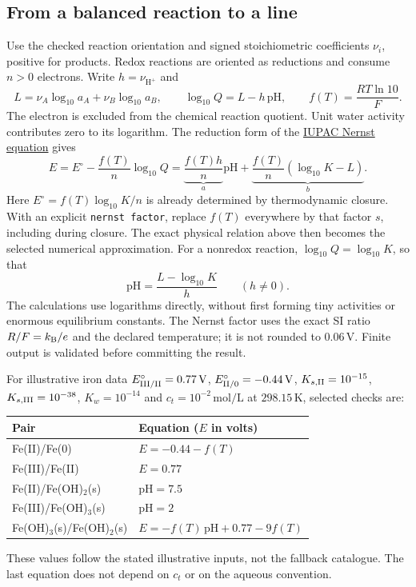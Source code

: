 \documentclass[a4paper,11pt]{ltxdoc}
\begin{document}
\subsection{From a balanced reaction to a line}
Use the checked reaction orientation and signed stoichiometric coefficients
$\nu_i$, positive for products. Redox reactions are oriented as reductions and
consume $n>0$ electrons. Write $h=\nu_{\mathrm{H}^+}$ and
\[
 L=\nu_A\log_{10}a_A+\nu_B\log_{10}a_B,\qquad
 \log_{10}Q=L-h\,\mathrm{pH},\qquad
 f(T)=\frac{RT\ln 10}{F}.
\]
The electron is excluded from the chemical reaction quotient. Unit water
activity contributes zero to its logarithm. The reduction form of the
\href{https://goldbook.iupac.org/terms/view/09068}{IUPAC Nernst equation} gives
\[
 E=E^\circ-\frac{f(T)}n\log_{10}Q
   =\underbrace{\frac{f(T)h}{n}}_a\mathrm{pH}
    +\underbrace{\frac{f(T)}n(\log_{10}K-L)}_b.
\]
Here $E^\circ=f(T)\log_{10}K/n$ is already determined by thermodynamic closure.
With an explicit \texttt{nernst factor}, replace $f(T)$ everywhere by that
factor $s$, including during closure. The exact physical relation above then
becomes the selected numerical approximation.
For a nonredox reaction, $\log_{10}Q=\log_{10}K$, so that
\[
 \mathrm{pH}=\frac{L-\log_{10}K}{h}\qquad(h\ne0).
\]
The calculations use logarithms directly, without first forming tiny activities
or enormous equilibrium constants. The Nernst factor uses the exact SI ratio
$R/F=k_{\rm B}/e$ and the declared temperature; it is not rounded to
$0.06\,\mathrm V$. Finite output is validated before committing the result.

For illustrative iron data $E^\circ_{\rm III/II}=0.77\,\mathrm V$,
$E^\circ_{\rm II/0}=-0.44\,\mathrm V$, $K_{s,\rm II}=10^{-15}$,
$K_{s,\rm III}=10^{-38}$, $K_w=10^{-14}$ and $c_t=10^{-2}\,\mathrm{mol/L}$
at $298.15\,\mathrm K$, selected checks are:
\begin{center}
\begin{tabular}{ll}
Pair & Equation ($E$ in volts)\\\hline
Fe(II)/Fe(0) & $E=-0.44-f(T)$\\
Fe(III)/Fe(II) & $E=0.77$\\
Fe(II)/Fe(OH)$_2$(s) & $\mathrm{pH}=7.5$\\
Fe(III)/Fe(OH)$_3$(s) & $\mathrm{pH}=2$\\
Fe(OH)$_3$(s)/Fe(OH)$_2$(s) & $E=-f(T)\,\mathrm{pH}+0.77-9f(T)$
\end{tabular}
\end{center}
These values follow the stated illustrative inputs, not the fallback catalogue.
The last equation does not depend on $c_t$ or on the aqueous convention.
\end{document}
